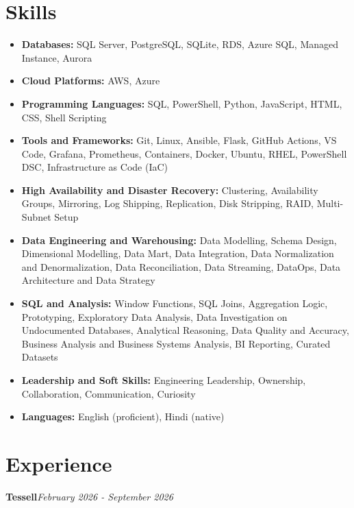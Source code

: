 \documentclass[10pt,a4paper]{article}
\begin{document}
\section{Skills}
\begin{itemize}
  \item \textbf{Databases:} SQL Server, PostgreSQL, SQLite, RDS, Azure SQL, Managed Instance, Aurora
  \item \textbf{Cloud Platforms:} AWS, Azure
  \item \textbf{Programming Languages:} SQL, PowerShell, Python, JavaScript, HTML, CSS, Shell Scripting
  \item \textbf{Tools and Frameworks:} Git, Linux, Ansible, Flask, GitHub Actions, VS Code, Grafana, Prometheus, Containers, Docker, Ubuntu, RHEL, PowerShell DSC, Infrastructure as Code (IaC)
  \item \textbf{High Availability and Disaster Recovery:} Clustering, Availability Groups, Mirroring, Log Shipping, Replication, Disk Stripping, RAID, Multi-Subnet Setup
  \item \textbf{Data Engineering and Warehousing:} Data Modelling, Schema Design, Dimensional Modelling, Data Mart, Data Integration, Data Normalization and Denormalization, Data Reconciliation, Data Streaming, DataOps, Data Architecture and Data Strategy
  \item \textbf{SQL and Analysis:} Window Functions, SQL Joins, Aggregation Logic, Prototyping, Exploratory Data Analysis, Data Investigation on Undocumented Databases, Analytical Reasoning, Data Quality and Accuracy, Business Analysis and Business Systems Analysis, BI Reporting, Curated Datasets
  \item \textbf{Leadership and Soft Skills:} Engineering Leadership, Ownership, Collaboration, Communication, Curiosity
  \item \textbf{Languages:} English (proficient), Hindi (native)
\end{itemize}

\section{Experience}

\noindent\textbf{Tessell}\hfill \textit{February 2026 - September 2026}
\end{document}
